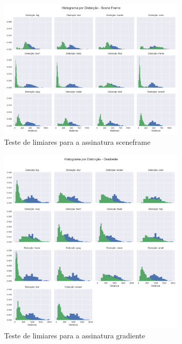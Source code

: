 \begin{figure}[h]
	\centering
	\label{fig:limiares-sceneframe}
	\caption{Teste de limiares para a assinatura sceneframe}
	\includegraphics[width=0.8\textwidth]{dados/figuras/experimentos/histograma_distorcao_Scene_Frame.png}
\end{figure}
\begin{figure}[h]
	\centering
	\label{fig:limiares-gradiente}
	\caption{Teste de limiares para a assinatura gradiente}
	\includegraphics[width=0.8\textwidth]{dados/figuras/experimentos/histograma_distorcao_Gradiente.png}
\end{figure}
